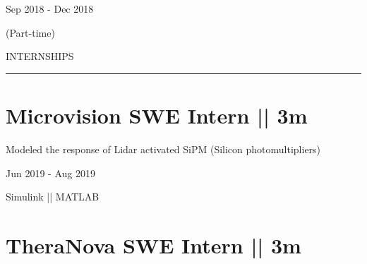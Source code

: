 \documentclass[letterpaper,10pt,oneside]{article}
\begin{document}
\begin{body}
\begin{subtitle}
\vspace{-7.8ex}
{{Sep 2018 - Dec 2018}} 
\end{subtitle}

\begin{subtitle}
\vspace{-2.0ex}
{{(Part-time)}} 
\end{subtitle}


{
\hspace{-1.72in}\noindent\color{cblue}
{INTERNSHIPS} %
}

\vspace{-1.6ex}
{\hspace{-1.73in}\noindent\color{dblue}\rule{6.935in}{0.4pt}} %
\vspace{-5ex}


\section
{\textbf{Microvision}
\newline
SWE Intern || 3m
\newline}


\vspace{-2.5ex}
\begin{detail}
\BulletItem
Modeled the response of Lidar activated SiPM (Silicon photomultipliers) 
\end{detail}

\begin{subtitle}
\vspace{-5ex}
{{Jun 2019 - Aug 2019}} 
\end{subtitle}

\vspace{-1.5ex}
{
\vspace{-0.8ex}
\color{cyan}\small
{Simulink || MATLAB} %
}
\vspace{-1.5ex}

\section
{\textbf{TheraNova}
\newline
SWE Intern || 3m
}


\end{body}
\end{document}
